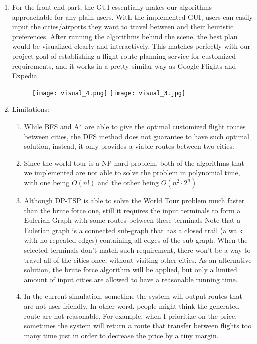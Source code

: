 \documentclass[fontsize=11pt]{article}
\begin{document}
\begin{enumerate}
            \item For the front-end part, the GUI essentially makes our algorithms approachable for any plain users. With the implemented GUI, users can easily input the cities/airports they want to travel between and their heuristic preferences. After running the algorithms behind the scene, the best plan would be visualized clearly and interactively. This matches perfectly with our project goal of establishing a flight route planning service for customized requirements, and it works in a pretty similar way as Google Flights and Expedia. 
            \begin{figure}[h]
                \centering
                \texttt{[image: visual\_4.png]}
                \texttt{[image: visual\_3.jpg]}
            \end{figure}
            \item Limitations:
            \begin{enumerate}
                \item While BFS and A* are able to give the optimal customized flight routes between cities, the DFS method does not guarantee to have such optimal solution, instead, it only provides a viable routes between two cities.
                \item Since the world tour is a NP hard problem, both of the algorithms that we implemented are not able to solve the problem in polynomial time, with one being $O(n!)$ and the other being $O(n^2\cdot2^n)$
                \item Although DP-TSP is able to solve the World Tour problem much faster than the brute force one, still it requires the input terminals to form a Eulerian Graph with some routes between these terminals Note that a Eulerian graph is a connected sub-graph that has a closed trail (a walk with no repeated edges) containing all edges of the sub-graph. When the selected terminals don't match such requirement, there won't be a way to travel all of the cities once, without visiting other cities. As an alternative solution, the brute force algorithm will be applied, but only a limited amount of input cities are allowed to have a reasonable running time.
                \item In the current simulation, sometime the system will output routes that are not user friendly. In other word, people might think the generated route are not reasonable. For example, when I prioritize on the price, sometimes the system will return a route that transfer between flights too many time just in order to decrease the price by a tiny margin.
            \end{enumerate}
            

\end{enumerate}
\end{document}
